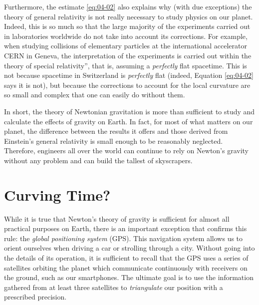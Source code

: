 Furthermore, the estimate \eqref{eq:04-02} also explains why (with due exceptions) the theory of
general relativity is not really necessary to study physics on our planet. Indeed, this
is so much so that the large majority of the experiments carried out in laboratories
worldwide do not take into account its corrections. For example, when studying
collisions of elementary particles at the international accelerator
CERN in Geneva, the interpretation of the experiments is carried out
within the theory of special relativity'', that is, assuming a
\emph{perfectly} flat spacetime. This is not because spacetime in Switzerland is
\emph{perfectly} flat (indeed, Equation \eqref{eq:04-02} says it is not), but because the
corrections to account for the local curvature are so small and complex that one can
easily do without them.

In short, the theory of Newtonian gravitation is more than sufficient to study and
calculate the effects of gravity on Earth. In fact, for most of what matters on our
planet, the difference between the results it offers and those derived from Einstein's
general relativity is small enough to be reasonably neglected. Therefore, engineers all
over the world can continue to rely on Newton's gravity without any problem and can
build the tallest of skyscrapers.

\section{Curving Time?}\label{sec:04-time}

While it is true that Newton's theory of gravity is sufficient for almost all practical
purposes on Earth, there is an important exception that confirms this rule: the
\emph{global positioning system} (GPS). This navigation system allows
us to orient ourselves when driving a car or strolling through a city. Without going
into the details of its operation, it is sufficient to recall that the GPS uses a series
of satellites orbiting the planet which communicate continuously with receivers on the
ground, such as our smartphones. The ultimate goal is to use the information gathered
from at least three satellites to \emph{triangulate} our position with a prescribed
precision.

